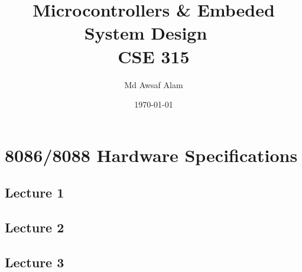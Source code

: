 \documentclass{book}
\title{Microcontrollers \& Embeded System Design ~\textbf{\\CSE 315}}
\author{Md Awsaf Alam}
\date{\today}
\begin{document}
\maketitle

\tableofcontents


\part{8086/8088 Hardware Specifications}

\chapter{Lecture 1}


\chapter{Lecture 2}


\chapter{Lecture 3}

\end{document}
